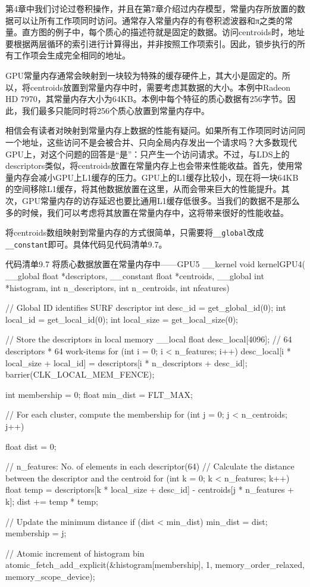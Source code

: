 第4章中我们讨论过卷积操作，并且在第7章介绍过内存模型，常量内存所放置的数据可以让所有工作项同时访问。通常存入常量内存的有卷积滤波器和π之类的常量。直方图的例子中，每个质心的描述符就是固定的数据。访问centroids时，地址要根据两层循环的索引进行计算得出，并非按照工作项索引。因此，锁步执行的所有工作项会生成完全相同的地址。

GPU常量内存通常会映射到一块较为特殊的缓存硬件上，其大小是固定的。所以，将centroids放置到常量内存中时，需要考虑其数据的大小。本例中Radeon HD 7970，其常量内存大小为64KB。本例中每个特征的质心数据有256字节。因此，我们最多只能同时将256个质心放置到常量内存中。

相信会有读者对映射到常量内存上数据的性能有疑问。如果所有工作项同时访问同一个地址，这些访问不是会被合并、只向全局内存发出一个请求吗？大多数现代GPU上，对这个问题的回答是“是”：只产生一个访问请求。不过，与LDS上的descriptors类似，将centroids放置在常量内存上也会带来性能收益。首先，使用常量内存会减小GPU上L1缓存的压力。GPU上的L1缓存比较小，现在将一块64KB的空间移除L1缓存，将其他数据放置在这里，从而会带来巨大的性能提升。其次，GPU常量内存的访存延迟也要比通用L1缓存低很多。当我们的数据不是那么多的时候，我们可以考虑将其放置在常量内存中，这将带来很好的性能收益。

将centroids数组映射到常量内存的方式很简单，只需要将\texttt{\_\_global}改成\texttt{\_\_constant}即可。具体代码见代码清单9.7。

\begin{codeboxt}[cpp]{代码清单9.7 将质心数据放置在常量内存中——GPU5}
__kernel
void kernelGPU4(
  __global float *descriptors,
  __constant float *centroids,
  __global int *histogram,
  int n_descriptors,
  int n_centroids,
  int nfeatures){

  // Global ID identifies SURF descriptor
  int desc_id = get_global_id(0);
  int local_id = get_local_id(0);
  int local_size = get_local_size(0);

  // Store the descriptors in local memory
  __local float desc_local[4096]; // 64 descriptors * 64 work-items
  for (int i = 0; i < n_features; i++){
    desc_local[i * local_size + local_id] =
        descriptors[i * n_descriptors + desc_id];
  }
  barrier(CLK_LOCAL_MEM_FENCE);

  int membership = 0;
  float min_dist = FLT_MAX;

  // For each cluster, compute the membership
  for (int j = 0; j < n_centroids; j++){
    float dist = 0;

    // n_features: No. of elements in each descriptor(64)
    // Calculate the distance between the descriptor and the centroid
    for (int k = 0; k < n_features; k++){
      float temp = descriptors[k * local_size + desc_id] -
        centroids[j * n_features + k];
      dist += temp * temp;
    }

    // Update the minimum distance
    if (dist < min_dist){
      min_dist = dist;
      membership = j;
    }
  }

  // Atomic increment of histogram bin
  atomic_fetch_add_explicit(&histogram[membership], 1, memory_order_relaxed, memory_scope_device);
}
\end{codeboxt}



